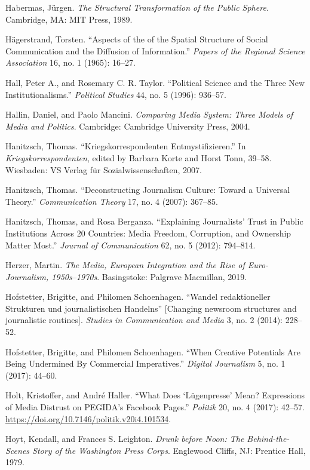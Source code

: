 \documentclass{tufte-handout}
\begin{document}
\begin{hangparas}{.25in}{1}
Habermas, Jürgen. \emph{The Structural Transformation of the Public
Sphere.} Cambridge, MA: MIT Press, 1989.

Hägerstrand, Torsten. ``Aspects of the of the Spatial Structure of
Social Communication and the Diffusion of Information.'' \emph{Papers of
the Regional Science Association} 16, no. 1 (1965): 16--27.

Hall, Peter A., and Rosemary C. R. Taylor. ``Political Science and the
Three New Institutionalisms.'' \emph{Political Studies} 44, no. 5
(1996): 936--57.

Hallin, Daniel, and Paolo Mancini. \emph{Comparing Media System: Three
Models of Media and Politics}. Cambridge: Cambridge University Press,
2004.

Hanitzsch, Thomas. ``Kriegskorrespondenten Entmystifizieren.'' In
\emph{Kriegskorrespondenten}, edited by Barbara Korte and Horst Tonn,
39--58. Wiesbaden: VS Verlag für Sozialwissenschaften, 2007.

Hanitzsch, Thomas. ``Deconstructing Journalism Culture: Toward a
Universal Theory.'' \emph{Communication Theory} 17, no. 4 (2007):
367--85.

Hanitzsch, Thomas, and Rosa Berganza. ``Explaining Journalists' Trust in
Public Institutions Across 20 Countries: Media Freedom, Corruption, and
Ownership Matter Most.'' \emph{Journal of Communication} 62, no. 5
(2012): 794--814.

Herzer, Martin. \emph{The Media, European Integration and the Rise of
Euro-Journalism, 1950s--1970s}. Basingstoke: Palgrave Macmillan, 2019.

Hofstetter, Brigitte, and Philomen Schoenhagen. ``Wandel redaktioneller
Strukturen und journalistischen Handelns'' {[}Changing newsroom
structures and journalistic routines{]}. \emph{Studies in Communication
and Media} 3, no. 2 (2014): 228--52.

Hofstetter, Brigitte, and Philomen Schoenhagen. ``When Creative
Potentials Are Being Undermined By Commercial Imperatives.''
\emph{Digital Journalism} 5, no. 1 (2017): 44--60.

Holt, Kristoffer, and André Haller. ``What Does `Lügenpresse' Mean?
Expressions of Media Distrust on PEGIDA's Facebook Pages.''
\emph{Politik} 20, no. 4 (2017): 42--57.
\url{https://doi.org/10.7146/politik.v20i4.101534}.

Hoyt, Kendall, and Frances S. Leighton. \emph{Drunk before Noon: The
Behind-the-Scenes Story of the Washington Press Corps}. Englewood
Cliffs, NJ: Prentice Hall, 1979.


\end{hangparas}
\end{document}
